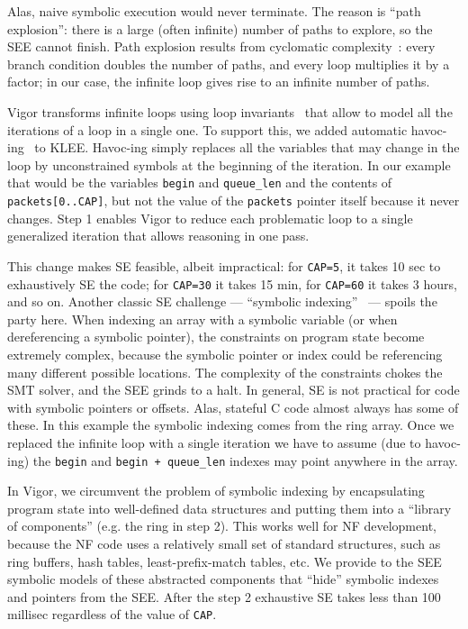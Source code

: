 \documentclass[letterpaper,twocolumn,10pt]{article}
\newcommand{\code}[1]{\lstinline{#1}}
\begin{document}
Alas, naive symbolic execution would never terminate. The reason is ``path
explosion'': there is a large (often infinite) number of paths to explore, so
the SEE cannot finish. Path explosion results from cyclomatic
complexity~\cite{mccabe:cyclomatic}: every branch condition doubles the number
of paths, and every loop multiplies it by a factor; in our case, the infinite
loop gives rise to an infinite number of paths.

Vigor transforms infinite loops using loop
invariants~\cite[\S~2.1]{cormen2009introduction} that allow to model all the
iterations of a loop in a single one. To support this, we added automatic
havoc-ing~\cite{barnett2005boogie} to KLEE. Havoc-ing simply replaces all the
variables that may change in the loop by unconstrained symbols at the beginning
of the iteration. In our example that would be the variables \code{begin} and
\code{queue_len} and the contents of \code{packets[0..CAP]}, but not the value
of the \code{packets} pointer itself because it never changes. Step 1 enables Vigor
to reduce each problematic loop to a single generalized iteration that allows
reasoning in one pass.

This change makes SE feasible, albeit impractical: for \code{CAP=5}, it takes 10
sec to exhaustively SE the code; for \code{CAP=30} it takes 15 min, for
\code{CAP=60} it takes 3 hours, and so on. Another classic SE challenge ---
``symbolic
indexing''~\cite{sen2005cute,godefroid2008automated,boonstoppel2008rwset} ---
spoils the party here. When indexing an array with a symbolic variable (or when
dereferencing a symbolic pointer), the constraints on program state become
extremely complex, because the symbolic pointer or index could be referencing
many different possible locations. The complexity of the constraints chokes the
SMT solver, and the SEE grinds to a halt. In general, SE is not practical for
code with symbolic pointers or offsets. Alas, stateful C code almost always has
some of these. In this example the symbolic indexing comes from the ring array.
Once we replaced the infinite loop with a single iteration we have to assume
(due to havoc-ing) the \code{begin} and \code{begin + queue_len} indexes may
point anywhere in the array.

In Vigor, we circumvent the problem of symbolic indexing by encapsulating
program state into well-defined data structures and putting them into a
``library of components'' (e.g. the ring in step 2). This works well for NF
development, because the NF code uses a relatively small set of standard
structures, such as ring buffers, hash tables, least-prefix-match tables, etc.
We provide to the SEE symbolic models of these abstracted components that
``hide'' symbolic indexes and pointers from the SEE. After the step 2 exhaustive
SE takes less than 100 millisec regardless of the value of \code{CAP}.
\end{document}

